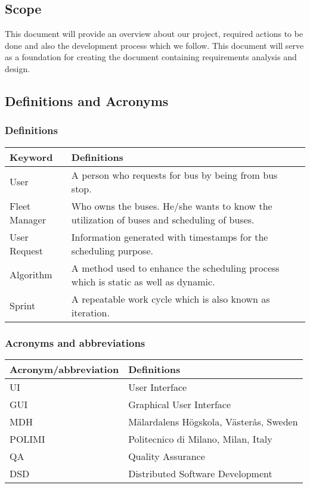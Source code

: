 \subsection{Scope}
This document will provide an overview about our project, required actions to be done and also the development process which we follow.
This document will serve as a foundation for creating the document containing requirements analysis and design.
\subsection{Definitions and Acronyms}
\subsubsection{Definitions}
\begin{center}
	\begin{tabular} { | m{3cm} | m{10cm} | }
		\hline
		\textbf{Keyword} & \textbf{Definitions}\\
		\hline
		User & A person who requests for bus by being from bus stop.\\
		\hline
		Fleet Manager & Who owns the buses. He/she wants to know the utilization of buses and scheduling of buses.\\
		\hline
		User Request & Information generated with timestamps for the scheduling purpose.\\
		\hline
		Algorithm & A method used to enhance the scheduling process which is static as well as dynamic.\\
		\hline
		Sprint & A repeatable work cycle which is also known as iteration.\\
		\hline
	\end{tabular}
\end{center}
\subsubsection{Acronyms and abbreviations}
\begin{center}
	\begin{tabular} { | m{5cm} | m{8cm} | }
		\hline
		\textbf{Acronym/abbreviation} & \textbf{Definitions}\\
		\hline
		UI & User Interface\\
		\hline
		GUI & Graphical User Interface\\
		\hline
		MDH & M\"{a}lardalens H\"{o}gskola, V\"{a}ster\r{a}s, Sweden\\
		\hline
		POLIMI & Politecnico di Milano, Milan, Italy\\
		\hline
		QA & Quality Assurance\\
		\hline
		DSD & Distributed Software Development\\
		\hline
	\end{tabular}
\end{center}